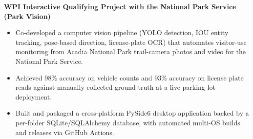 \textbf{WPI Interactive Qualifying Project with the National Park Service (Park Vision)}
\begin{itemize}
  \item Co-developed a computer vision pipeline (YOLO detection, IOU entity tracking, pose-based direction, license-plate OCR) that automates visitor-use monitoring from Acadia National Park trail-camera photos and video for the National Park Service.
  \item Achieved 98\% accuracy on vehicle counts and 93\% accuracy on license plate reads against manually collected ground truth at a live parking lot deployment.
  \item Built and packaged a cross-platform PySide6 desktop application backed by a per-folder SQLite/SQLAlchemy database, with automated multi-OS builds and releases via GitHub Actions.
\end{itemize}
